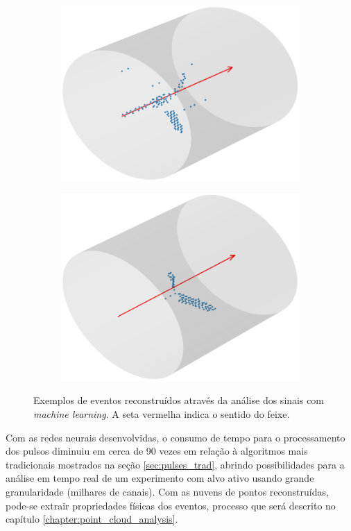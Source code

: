\documentclass[a4paper,12pt,oneside]{book}
\begin{document}
\begin{figure}[H]
\begin{subfigure}[b]{0.48\textwidth}
        \includegraphics[scale=0.38]{figs/ex_ev_3.png}
        \caption{}
        \label{subfig:ex_ev_3}
    \end{subfigure}%
    \hfill
    \begin{subfigure}[b]{0.48\textwidth}
        \centering
        \includegraphics[scale=0.38]{figs/ex_ev_4.png}
        \caption{}
        \label{subfig:ex_ev_4}
    \end{subfigure}
\caption{Exemplos de eventos reconstruídos através da análise dos sinais com \textit{machine learning}. A seta vermelha indica o sentido do feixe.}
\label{fig:ex_eventos}
\end{figure}

\par Com as redes neurais desenvolvidas, o consumo de tempo para o processamento dos pulsos diminuiu em cerca de 90 vezes em relação à algoritmos mais tradicionais mostrados na seção \ref{sec:pulses_trad}, abrindo possibilidades para a análise em tempo real de um experimento com alvo ativo usando grande granularidade (milhares de canais). Com as nuvens de pontos reconstruídas, pode-se extrair propriedades físicas dos eventos, processo que será descrito no capítulo \ref{chapter:point_cloud_analysis}.
\end{document}
